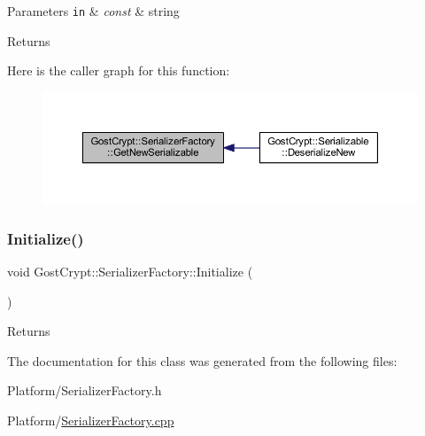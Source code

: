 \begin{DoxyParams}[1]{Parameters}
\mbox{\tt in}  & {\em const} & string \\
\hline
\end{DoxyParams}
\begin{DoxyReturn}{Returns}

\end{DoxyReturn}
Here is the caller graph for this function\+:
\nopagebreak
\begin{figure}[H]
\begin{center}
\leavevmode
\includegraphics[width=350pt]{class_gost_crypt_1_1_serializer_factory_aa7486ab2f62a5966ceefc529d659fa47_icgraph}
\end{center}
\end{figure}
\mbox{\label{class_gost_crypt_1_1_serializer_factory_a239d809a73a505a9985f717128284ff6}} 
\subsubsection{\texorpdfstring{Initialize()}{Initialize()}}
{\footnotesize\ttfamily void Gost\+Crypt\+::\+Serializer\+Factory\+::\+Initialize (\begin{DoxyParamCaption}{ }\end{DoxyParamCaption})\hspace{0.3cm}{\ttfamily [static]}}

\begin{DoxyReturn}{Returns}

\end{DoxyReturn}


The documentation for this class was generated from the following files\+:\begin{DoxyCompactItemize}
\item 
Platform/Serializer\+Factory.\+h\item 
Platform/\hyperlink{_serializer_factory_8cpp}{Serializer\+Factory.\+cpp}\end{DoxyCompactItemize}
